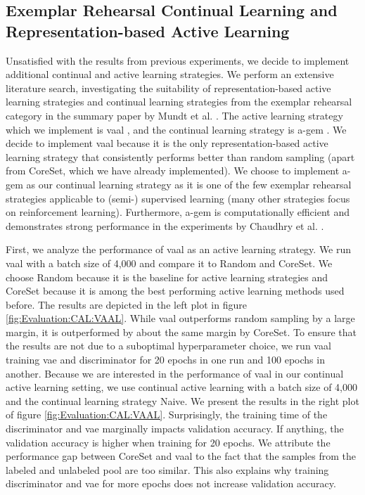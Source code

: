\subsection{Exemplar Rehearsal Continual Learning and Representation-based Active Learning}
\label{sec:Evaluation:CAL:VAAL_AGEM}
Unsatisfied with the results from previous experiments, we decide to implement additional continual and active learning strategies. We perform an extensive literature search,
investigating the suitability of representation-based active learning strategies and continual learning strategies from the exemplar rehearsal category in the summary paper
by Mundt et al. \cite{mundt2020wholistic}. The active learning strategy which we implement is \gls{vaal} \cite{sinha2019variational}, and the continual learning strategy is
\gls{a-gem} \cite{chaudhry2018efficient}. We decide to implement \gls{vaal} because it is the only representation-based active learning strategy that consistently performs
better than random sampling (apart from CoreSet, which we have already implemented). We choose to implement \gls{a-gem} as our continual learning strategy as it
is one of the few exemplar rehearsal strategies applicable to (semi-) supervised learning (many other strategies focus on reinforcement learning). Furthermore, \gls{a-gem}
is computationally efficient and demonstrates strong performance in the experiments by Chaudhry et al. \cite{chaudhry2018efficient}. \par
First, we analyze the performance of \gls{vaal} as an active learning strategy. We run \gls{vaal} with a batch size of 4,000 and compare it to Random and CoreSet. We choose
Random because it is the baseline for active learning strategies and CoreSet because it is among the best performing active learning methods used before. The results
are depicted in the left plot in figure \ref{fig:Evaluation:CAL:VAAL}. While \gls{vaal} outperforms random sampling by a large margin, it is outperformed by about the
same margin by CoreSet. To ensure that the results are not due to a suboptimal hyperparameter choice, we run \gls{vaal} training \gls{vae} and discriminator for 20 epochs in
one run and 100 epochs in another. Because we are interested in the performance of \gls{vaal} in our continual active learning setting, we use continual active learning with
a batch size of 4,000 and the continual learning strategy Naive. We present the results in the right plot of figure \ref{fig:Evaluation:CAL:VAAL}.
Surprisingly, the training time of the discriminator and \gls{vae} marginally impacts validation accuracy. If anything, the validation accuracy is higher when training for
20 epochs. We attribute the performance gap between CoreSet and \gls{vaal} to the fact that the samples from the labeled and unlabeled pool are too similar. This also
explains why training discriminator and \gls{vae} for more epochs does not increase validation accuracy. \par

